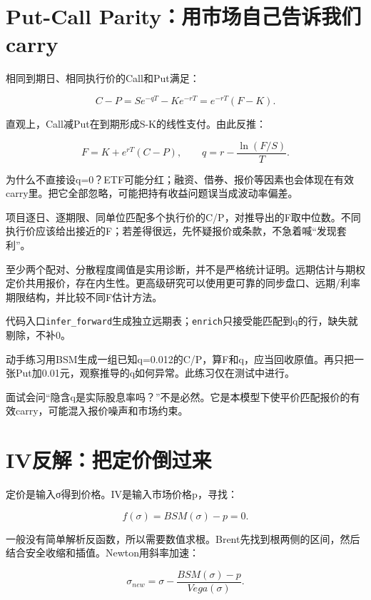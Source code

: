 \documentclass[UTF8,11pt,a4paper]{ctexart}
\begin{document}
\section{Put-Call Parity：用市场自己告诉我们carry}

相同到期日、相同执行价的Call和Put满足：

\[
C-P=Se^{-qT}-Ke^{-rT}=e^{-rT}(F-K).
\]

直观上，Call减Put在到期形成S-K的线性支付。由此反推：

\[
F=K+e^{rT}(C-P),\qquad q=r-\frac{\ln(F/S)}T.
\]

为什么不直接设q=0？ETF可能分红；融资、借券、报价等因素也会体现在有效carry里。把它全部忽略，可能把持有收益问题误当成波动率偏差。

项目逐日、逐期限、同单位匹配多个执行价的C/P，对推导出的F取中位数。不同执行价应该给出接近的F；若差得很远，先怀疑报价或条款，不急着喊“发现套利”。

至少两个配对、分散程度阈值是实用诊断，并不是严格统计证明。远期估计与期权定价共用报价，存在内生性。更高级研究可以使用更可靠的同步盘口、远期/利率期限结构，并比较不同F估计方法。

\begin{learningbox}{代码入口}\texttt{infer\_forward}生成独立远期表；\texttt{enrich}只接受能匹配到q的行，缺失就剔除，不补0。\end{learningbox}

\begin{learningbox}{动手练习}用BSM生成一组已知q=0.012的C/P，算F和q，应当回收原值。再只把一张Put加0.01元，观察推导的q如何异常。此练习仅在测试中进行。\end{learningbox}

\begin{learningbox}{面试会问}“隐含q是实际股息率吗？”不是必然。它是本模型下使平价匹配报价的有效carry，可能混入报价噪声和市场约束。\end{learningbox}


\section{IV反解：把定价倒过来}

定价是输入σ得到价格。IV是输入市场价格p，寻找：

\[
f(\sigma)=BSM(\sigma)-p=0.
\]

一般没有简单解析反函数，所以需要数值求根。Brent先找到根两侧的区间，然后结合安全收缩和插值。Newton用斜率加速：

\[
\sigma_{new}=\sigma-\frac{BSM(\sigma)-p}{Vega(\sigma)}.
\]
\end{document}
